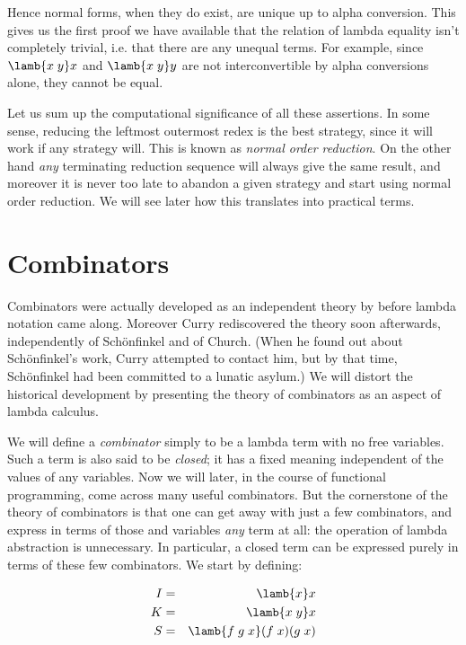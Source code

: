 Hence normal forms, when they do exist, are unique up to alpha conversion. This
gives us the first proof we have available that the relation of lambda equality
isn't completely trivial, i.e. that there are any unequal terms. For example,
since $\lamb{x\; y} x$ and $\lamb{x\; y} y$ are not interconvertible by alpha
conversions alone, they cannot be equal.

Let us sum up the computational significance of all these assertions. In some
sense, reducing the leftmost outermost redex is the best strategy, since it
will work if any strategy will. This is known as {\em normal order reduction}.
On the other hand {\em any} terminating reduction sequence will always give the
same result, and moreover it is never too late to abandon a given strategy and
start using normal order reduction. We will see later how this translates into
practical terms.

\section{Combinators}

Combinators were actually developed as an independent theory by
 before lambda notation came along. Moreover Curry
rediscovered the theory soon afterwards, independently of Sch\"onfinkel and of
Church. (When he found out about Sch\"onfinkel's work, Curry attempted to
contact him, but by that time, Sch\"onfinkel had been committed to a lunatic
asylum.) We will distort the historical development by presenting the theory of
combinators as an aspect of lambda calculus.

We will define a {\em combinator} simply to be a lambda term with no free
variables. Such a term is also said to be {\em closed}; it has a fixed meaning
independent of the values of any variables. Now we will later, in the course of
functional programming, come across many useful combinators. But the
cornerstone of the theory of combinators is that one can get away with just a
few combinators, and express in terms of those and variables {\em any} term at
all: the operation of lambda abstraction is unnecessary. In particular, a
closed term can be expressed purely in terms of these few combinators. We start
by defining:

\begin{eqnarray*}
I & = & \lamb{x} x                              \\
K & = & \lamb{x\; y} x                          \\
S & = & \lamb{f\; g\; x} (f\; x)(g\; x)
\end{eqnarray*}

